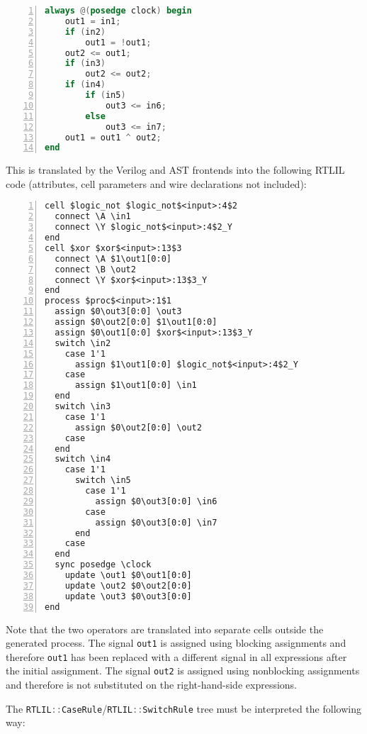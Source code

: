 \begin{lstlisting}[numbers=left,frame=single,language=Verilog]
always @(posedge clock) begin
	out1 = in1;
	if (in2)
		out1 = !out1;
	out2 <= out1;
	if (in3)
		out2 <= out2;
	if (in4)
		if (in5)
			out3 <= in6;
		else
			out3 <= in7;
	out1 = out1 ^ out2;
end
\end{lstlisting}

This is translated by the Verilog and AST frontends into the following RTLIL code (attributes, cell parameters
and wire declarations not included):

\begin{lstlisting}[numbers=left,frame=single,language=rtlil]
cell $logic_not $logic_not$<input>:4$2
  connect \A \in1
  connect \Y $logic_not$<input>:4$2_Y
end
cell $xor $xor$<input>:13$3
  connect \A $1\out1[0:0]
  connect \B \out2
  connect \Y $xor$<input>:13$3_Y
end
process $proc$<input>:1$1
  assign $0\out3[0:0] \out3
  assign $0\out2[0:0] $1\out1[0:0]
  assign $0\out1[0:0] $xor$<input>:13$3_Y
  switch \in2
    case 1'1
      assign $1\out1[0:0] $logic_not$<input>:4$2_Y
    case
      assign $1\out1[0:0] \in1
  end
  switch \in3
    case 1'1
      assign $0\out2[0:0] \out2
    case
  end
  switch \in4
    case 1'1
      switch \in5
        case 1'1
          assign $0\out3[0:0] \in6
        case
          assign $0\out3[0:0] \in7
      end
    case
  end
  sync posedge \clock
    update \out1 $0\out1[0:0]
    update \out2 $0\out2[0:0]
    update \out3 $0\out3[0:0]
end
\end{lstlisting}

Note that the two operators are translated into separate cells outside the generated process. The signal
\lstinline[language=Verilog]{out1} is assigned using blocking assignments and therefore \lstinline[language=Verilog]{out1}
has been replaced with a different signal in all expressions after the initial assignment. The signal
\lstinline[language=Verilog]{out2} is assigned using nonblocking assignments and therefore is not substituted
on the right-hand-side expressions.

The \lstinline[language=C++]{RTLIL::CaseRule}/\lstinline[language=C++]{RTLIL::SwitchRule}
tree must be interpreted the following way:

